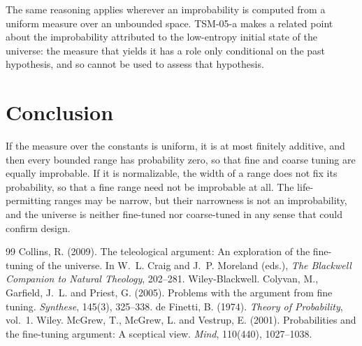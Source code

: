 \documentclass{situationist-preprint}
\begin{document}
The same reasoning applies wherever an improbability is computed from a uniform measure over an unbounded space. TSM-05-a makes a related point about the improbability attributed to the low-entropy initial state of the universe: the measure that yields it has a role only conditional on the past hypothesis, and so cannot be used to assess that hypothesis.

\section{Conclusion}

If the measure over the constants is uniform, it is at most finitely additive, and then every bounded range has probability zero, so that fine and coarse tuning are equally improbable. If it is normalizable, the width of a range does not fix its probability, so that a fine range need not be improbable at all. The life-permitting ranges may be narrow, but their narrowness is not an improbability, and the universe is neither fine-tuned nor coarse-tuned in any sense that could confirm design.

\begin{thebibliography}{99}\small
{} Collins, R. (2009). The teleological argument: An exploration of the fine-tuning of the universe. In W.~L. Craig and J.~P. Moreland (eds.), \emph{The Blackwell Companion to Natural Theology}, 202--281. Wiley-Blackwell.
 Colyvan, M., Garfield, J.~L. and Priest, G. (2005). Problems with the argument from fine tuning. \emph{Synthese}, 145(3), 325--338.
 de Finetti, B. (1974). \emph{Theory of Probability}, vol.~1. Wiley.
 McGrew, T., McGrew, L. and Vestrup, E. (2001). Probabilities and the fine-tuning argument: A sceptical view. \emph{Mind}, 110(440), 1027--1038.
\end{thebibliography}
\end{document}
